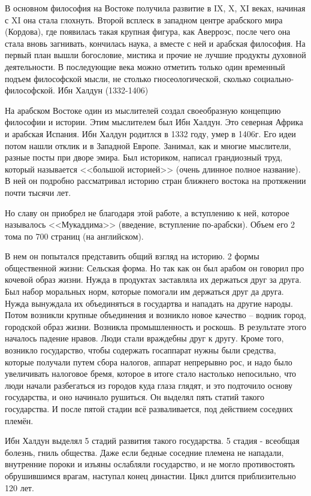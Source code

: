 В основном философия на Востоке получила развитие в IX, X, XI веках, начиная с XI она стала глохнуть. Второй всплеск в западном центре арабского мира (Кордова), где появилась такая крупная фигура, как Аверроэс, после чего она стала вновь загнивать, кончилась наука, а вместе с ней и арабская философия. На первый план вышли богословие, мистика и прочие не лучшие продукты духовной деятельности. В последующие века можно отметить только один временный подъем философской мысли, не столько гносеологической, сколько социально-философской.
Ибн Халдун (1332-1406)

На арабском Востоке один из мыслителей создал своеобразную концепцию философии и истории. Этим мыслителем был Ибн Халдун. Это северная Африка и арабская Испания. Ибн Халдун родитлся в 1332 году, умер в 1406г. Его идеи потом нашли отклик и в Западной Европе. Занимал, как и многие мыслители, разные посты при дворе эмира. Был историком, написал грандиозный труд, который называется <<большой историей>> (очень длинное полное название). В ней он подробно рассматривал историю стран ближнего востока на протяжении почти тысячи лет.

Но славу он приобрел не благодаря этой работе, а вступлению к ней, которое называлось <<Мукаддима>> (введение, вступление по-арабски). Объем его 2 тома по 700 страниц (на английском).

    В нем он попытался представить общий взгляд на историю. 2 формы общественной жизни: Сельская форма. Но так как он был арабом он говорил про кочевой образ жизни. Нужда в продуктах заставляла их держаться друг за друга. Был набор моральных норм, которые помогали им держаться друг да друга. Нужда вынуждала их объединяться в государтва и нападать на другие народы. Потом возникли крупные объединения и возникло новое качество – водник город, городской образ жизни. Возникла промышленность и роскошь. В результате этого началось падение нравов. Люди стали враждебны друг к другу. Кроме того, возникло государство, чтобы содержать госаппарат нужны были средства, которые получали путем сбора налогов, аппарат непрерывно рос, и надо было увеличивать налоговое бремя, которое в итоге стало настолько непосильно, что люди начали разбегаться из городов куда глаза глядят, и это подточило основу государства, и оно начинало рушиться. Он выделял пять статий такого государства. И после пятой стадии всё разваливается, под действием соседних племён.

Ибн Халдун выделял 5 стадий развития такого государства. 5 стадия - всеобщая болезнь, гниль общества. Даже если бедные соседние племена не нападали, внутренние пороки и изъяны ослабляли государство, и не могло противостоять обрушившимся врагам, наступал конец династии. Цикл длится приблизительно 120 лет.


